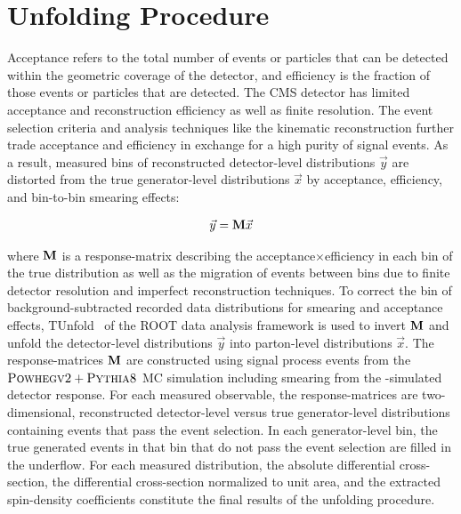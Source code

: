\section{Unfolding Procedure}
\label{Unfolding_Procedure}
Acceptance refers to the total number of events or particles that can be detected within the geometric coverage of the detector, and efficiency is the fraction of those events or particles that are detected.
The CMS detector has limited acceptance and reconstruction efficiency as well as finite resolution.
The event selection criteria and analysis techniques like the \ttbar kinematic reconstruction further trade acceptance and efficiency in exchange for a high purity of signal events.
As a result, measured bins of reconstructed detector-level distributions $\vec{y}$ are distorted from the true generator-level distributions $\vec{x}$ by acceptance, efficiency, and bin-to-bin smearing effects:
\begin{linenomath*}
\begin{align}
\vec{y} = \mathbf{M} \vec{x}
\end{align}
\end{linenomath*}
where $\mathbf{M}$ is a response-matrix describing the acceptance$\times$efficiency in each bin of the true distribution as well as the migration of events between bins due to finite detector resolution and imperfect reconstruction techniques.
To correct the bin of background-subtracted recorded data distributions for smearing and acceptance effects, TUnfold~\cite{TUnfold} of the ROOT data analysis framework is used to invert $\mathbf{M}$ and unfold the detector-level distributions $\vec{y}$ into parton-level distributions $\vec{x}$.
The response-matrices $\mathbf{M}$ are constructed using signal process events from the ${\textsc{Powhegv2}} + {\textsc{Pythia8}}$ MC simulation including smearing from the \Geant-simulated detector response.
For each measured observable, the response-matrices are two-dimensional, reconstructed detector-level versus true generator-level distributions containing events that pass the event selection.
In each generator-level bin, the true generated events in that bin that do not pass the event selection are filled in the underflow.
For each measured distribution, the absolute differential cross-section, the differential cross-section normalized to unit area, and the extracted spin-density coefficients constitute the final results of the unfolding procedure.

